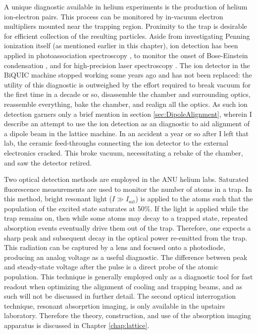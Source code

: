 	A unique diagnostic available in helium experiments is the production of helium ion-electron pairs.
	This process can be monitored by in-vacuum electron multipliers mounted near the trapping region.
	Proximity to the trap is desirable for efficient collection of the resulting particles.
	Aside from investigating Penning ionization itself (as mentioned earlier in this chapter), ion detection has been applied in photoassociation spectroscopy \cite{herschbach00,koelemeij04}, to monitor the onset of Bose-Einstein condensation \cite{tychkov06}, and for high-precision laser spectroscopy \cite{Rengelink18}.
	The ion detector in the BiQUIC machine stopped working some years ago and has not been replaced: the utility of this diagnostic is outweighed by the effort required to break vacuum for the first time in a decade or so, disassemble the chamber and surrounding optics, reassemble everything, bake the chamber, and realign all the optics.
	As such ion detection garners only a brief mention in section \ref{sec:DipoleAlignment}, wherein I describe an attempt to use the ion detection as an diagnostic to aid alignment of a dipole beam in the lattice machine.
	In an accident a year or so after I left that lab, the ceramic feed-throughs connecting the ion detector to the external electronics cracked.
	This broke vacuum, necessitating a rebake of the chamber, and saw the detector retired.
	

	Two optical detection methods are employed in the ANU helium labs.
	Saturated fluorescence measurements are used to monitor the number of atoms in a trap.
	In this method, bright resonant light ($I\gg I_\textrm{sat}$) is applied to the atoms such that the population of the excited state saturates at 50\%.
	If the light is applied while the trap remains on, then while some atoms may decay to a trapped state, repeated absorption events eventually drive them out of the trap.
	Therefore, one expects a sharp peak and subsequent decay in the optical power re-emitted from the trap.
	This radiation can be captured by a lens and focused onto a photodiode, producing an analog voltage as a useful diagnostic.
	The difference between peak and steady-state voltage after the pulse is a direct probe of the atomic population.
	This technique is generally employed only as a diagnostic tool for fast readout when optimizing the alignment of cooling and trapping beams, and as such will not be discussed in further detail.
	The second optical interrogation technique, resonant absorprtion imaging, is only available in the upstairs laboratory.
	Therefore the theory, construction, and use of the absorption imaging apparatus is discussed in Chapter \ref{chap:lattice}.


